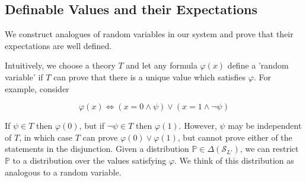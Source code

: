 \documentclass[12pt]{article}
\newcommand{\PP}{\mathbb{P}}
\newcommand{\vp}{\varphi}
\newcommand{\cSL}{{\cS_{\cL}}}
\newcommand{\cL}{L'}
\newcommand{\cS}{\mathcal{S}}
\theoremstyle{plain}
\theoremstyle{definition}
\theoremstyle{remark}
\begin{document}
\subsection{Definable Values and their Expectations}
We construct analogues of random variables in our system and prove that their expectations are well defined.

Intuitively, we choose a theory $T$ and let any formula $\vp(x)$ define a 'random variable' if $T$ can prove that there is a unique value which satisfies $\vp$. For example, consider

$$\vp(x) \iff (x = 0 \wedge \psi) \vee (x = 1 \wedge \neg \psi)$$

If $\psi\in T$ then $\vp(0)$, but if $\neg \psi\in T$ then $\vp(1)$. 
However, $\psi$ may be independent of $T$, in which case $T$ can prove $\vp(0)\vee\vp(1)$, but cannot prove either of the statements in the disjunction.
Given a distribution $\PP\in \Delta(\cSL)$, we can restrict $\PP$ to a distribution over the values satisfying $\vp$.
We think of this distribution as analogous to a random variable.
\end{document}
